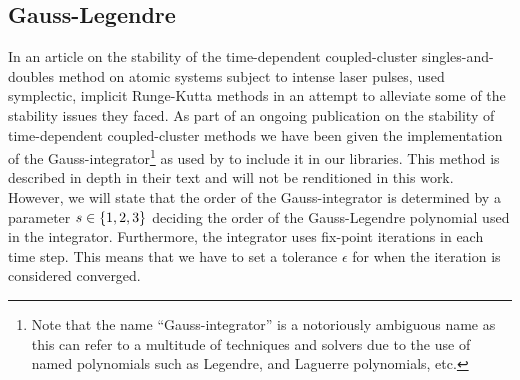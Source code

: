         \subsection{Gauss-Legendre}
            \label{subsec:gauss-legendre}
            In an article on the stability of the time-dependent coupled-cluster
            singles-and-doubles method on atomic systems subject to intense
            laser pulses, \citeauthor{pedersen2018symplectic}
            \cite{pedersen2018symplectic} used symplectic, implicit Runge-Kutta
            methods in an attempt to alleviate some of the stability issues they
            faced.
            As part of an ongoing publication on the stability of time-dependent
            coupled-cluster methods \cite{oa-stability} we have been given the
            implementation of the Gauss-integrator\footnote{%
                Note that the name ``Gauss-integrator'' is a notoriously
                ambiguous name as this can refer to a multitude of techniques
                and solvers due to the use of named polynomials such as
                Legendre, and Laguerre polynomials, etc.%
            } as used by \citeauthor{pedersen2018symplectic}
            \cite{pedersen2018symplectic} to include it in our libraries.
            This method is described in depth in their text
             \cite{pedersen2018symplectic} and
            will not be renditioned in this work.
            However, we will state that the order of the Gauss-integrator is
            determined by a parameter $s \in \left\{ 1, 2, 3 \right\}$ deciding the order
            of the Gauss-Legendre polynomial used in the integrator.
            Furthermore, the integrator uses fix-point iterations in each time
            step.
            This means that we have to set a tolerance $\epsilon$ for when the
            iteration is considered converged.

\clearemptydoublepage

